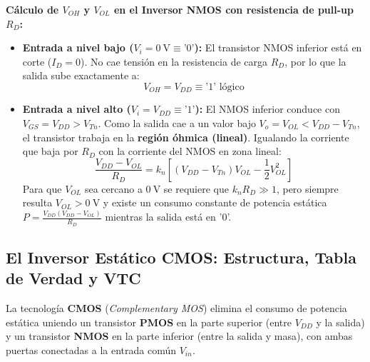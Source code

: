 \textbf{Cálculo de $V_{OH}$ y $V_{OL}$ en el Inversor NMOS con resistencia de pull-up $R_D$:}
\begin{itemize}[leftmargin=*]
    \item \textbf{Entrada a nivel bajo ($V_i = 0\ \si{\volt} \equiv \text{'0'}$):} El transistor NMOS inferior está en corte ($I_D = 0$). No cae tensión en la resistencia de carga $R_D$, por lo que la salida sube exactamente a:
    \begin{equation}
        V_{OH} = V_{DD} \equiv \text{'1' lógico}
    \end{equation}
    \item \textbf{Entrada a nivel alto ($V_i = V_{DD} \equiv \text{'1'}$):} El NMOS inferior conduce con $V_{GS} = V_{DD} > V_{Tn}$. Como la salida cae a un valor bajo $V_o = V_{OL} < V_{DD} - V_{Tn}$, el transistor trabaja en la \textbf{región óhmica (lineal)}. Igualando la corriente que baja por $R_D$ con la corriente del NMOS en zona lineal:
    \begin{equation}
        \frac{V_{DD} - V_{OL}}{R_D} = k_n \left[ (V_{DD} - V_{Tn}) V_{OL} - \frac{1}{2} V_{OL}^2 \right]
    \end{equation}
    Para que $V_{OL}$ sea cercano a $0\ \si{\volt}$ se requiere que $k_n R_D \gg 1$, pero siempre resulta $V_{OL} > 0\ \si{\volt}$ y existe un consumo constante de potencia estática $P = \frac{V_{DD}(V_{DD}-V_{OL})}{R_D}$ mientras la salida está en '0'.
\end{itemize}

\subsection{El Inversor Estático CMOS: Estructura, Tabla de Verdad y VTC}
La tecnología \textbf{CMOS} (\textit{Complementary MOS}) elimina el consumo de potencia estática uniendo un transistor \textbf{PMOS} en la parte superior (entre $V_{DD}$ y la salida) y un transistor \textbf{NMOS} en la parte inferior (entre la salida y masa), con ambas puertas conectadas a la entrada común $V_{in}$.

\begin{center}
\end{center}

